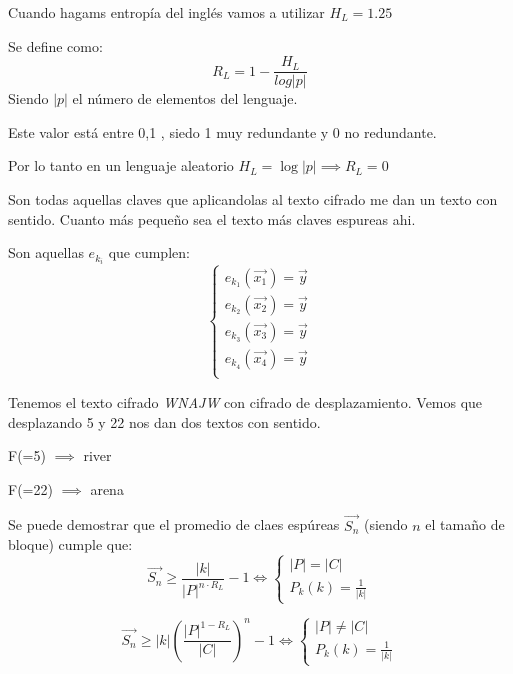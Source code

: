 Cuando hagams entropía del inglés vamos a utilizar $H_L = 1.25$

\begin{defn}[Redundancia] Se define como:
 $$R_L = 1- \frac{H_L}{log |p|}$$
  Siendo $|p|$ el número de elementos del lenguaje.
  
  Este valor está entre {0,1} , siedo 1 muy redundante y 0 no redundante.
\end{defn}

Por lo tanto en un lenguaje aleatorio $H_L = \log |p| \implies R_L = 0$

\begin{defn}
	
	Son todas aquellas claves que aplicandolas al texto cifrado me dan un texto con sentido. Cuanto más pequeño sea el texto más claves espureas ahi.
	
	Son aquellas $e_{k_i}$ que cumplen:
	$$\begin{cases}
	 e_{k_1}(\overrightarrow{x_1}) = \overrightarrow{y}\\
	 e_{k_2}(\overrightarrow{x_2}) = \overrightarrow{y}\\
	 e_{k_3}(\overrightarrow{x_3}) = \overrightarrow{y}\\
	 e_{k_4}(\overrightarrow{x_4}) = \overrightarrow{y}\\
	\end{cases}$$
\end{defn}

\begin{example}
	Tenemos el texto cifrado \textit{WNAJW}  
	con cifrado de desplazamiento.
	Vemos que desplazando 5 y 22 nos dan dos textos con sentido.
	
	F(=5) $\implies$ river
	
	F(=22) $\implies$ arena
\end{example}

Se puede demostrar que el promedio de claes espúreas $\overrightarrow{S_n}$ (siendo $n$ el tamaño de bloque) cumple que:
$$\overrightarrow{S_n} \geq \frac{|k|}{|P|^{n\cdot R_L}} -1 \iff \begin{cases}
	 |P| = |C|\\P_k(k) = \frac{1}{|k|}
\end{cases}$$

$$\overrightarrow{S_n} \geq |k| (\frac{|P|^{1-R_L}}{|C|})^n -1 \iff \begin{cases}
|P| \neq |C|\\P_k(k) = \frac{1}{|k|}
\end{cases}$$

